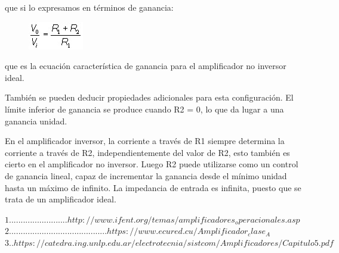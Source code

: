 \documentclass[10pt,letterpaper]{article}
\begin{document}
que si lo expresamos en términos de ganancia:

\begin{figure}[h!]
\centering
\includegraphics[scale=1]{formula4}
\end{figure}

que es la ecuación característica de ganancia para el amplificador no inversor ideal.

También se pueden deducir propiedades adicionales para esta configuración. El límite inferior de ganancia se produce cuando R2 = 0, lo que da lugar a una ganancia unidad.

En el amplificador inversor, la corriente a través de R1 siempre determina la corriente a través de R2, independientemente del valor de R2, esto también es cierto en el amplificador no inversor. Luego R2 puede utilizarse como un control de ganancia lineal, capaz de incrementar la ganancia desde el mínimo unidad hasta un máximo de infinito. La impedancia de entrada es infinita, puesto que se trata de un amplificador ideal.


$1.........................http://www.ifent.org/temas/amplificadores_operacionales.asp$
\linebreak
$2..........................................https://www.ecured.cu/Amplificador_clase_A$
\linebreak
$3..https://catedra.ing.unlp.edu.ar/electrotecnia/sistcom/Amplificadores/Capitulo5.pdf$
\end{document}
